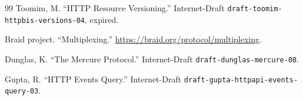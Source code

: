 \documentclass[11pt,a4paper]{article}
\begin{document}
\begin{thebibliography}{99}
Toomim, M. ``HTTP Resource Versioning.'' Internet-Draft \nolinkurl{draft-toomim-httpbis-versions-04}, expired.

Braid project. ``Multiplexing.'' \url{https://braid.org/protocol/multiplexing}.

Dunglas, K. ``The Mercure Protocol.'' Internet-Draft \nolinkurl{draft-dunglas-mercure-08}.

Gupta, R. ``HTTP Events Query.'' Internet-Draft \nolinkurl{draft-gupta-httpapi-events-query-03}.

\end{thebibliography}
\end{document}
